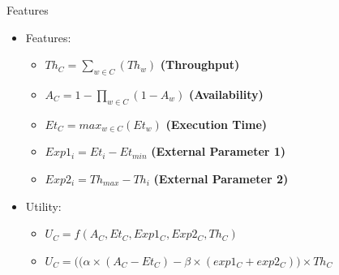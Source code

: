\documentclass{beamer}
\begin{document}
\begin{frame}{Features}
    \begin{itemize}
        \item Features:
        \begin{itemize}
            \item $Th_{C} = \sum_{w \in C}{(Th_{w})}$ \textbf{(Throughput)}
            \vspace{0.05cm}
            \item $A_{C} = 1-\prod_{w \in C}{(1-A_{w})}$ \textbf{(Availability)}
            \vspace{0.05cm}
            \item $Et_{C} = max_{w \in C}{(Et_{w})}$ \textbf{(Execution Time)}
            \vspace{0.05cm}
            \item $Exp1_i = Et_{i} - Et_{min}$ \textbf{(External Parameter 1)}
            \vspace{0.05cm}
            \item $Exp2_i = Th_{max} - Th_{i}$ \textbf{(External Parameter 2)}
        \end{itemize}
        \vspace{0.3cm}
        \item Utility:
        \begin{itemize}
            \item $U_{C} = f(A_{C}, Et_{C}, Exp1_{C}, Exp2_{C}, Th_{C})$
            \vspace{0.05cm}
            \item $U_{C} = \big((\alpha \times (A_{C} - Et_{C}) - \beta \times (exp1_{C} + exp2_{C})\big) \times Th_{C}$
        \end{itemize}
    \end{itemize}
\end{frame}
\end{document}

